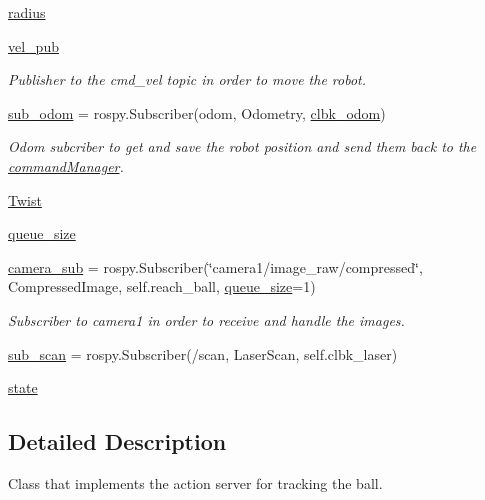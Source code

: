 \begin{DoxyCompactItemize}
\hyperlink{classtrackObj_1_1TrackAction_ae25c734aa5186c31952d4faaa46f2c87}{radius}
\item 
\hyperlink{classtrackObj_1_1TrackAction_ab9175815577a975030b162b3f450995a}{vel\+\_\+pub}
\begin{DoxyCompactList}\small\item\em Publisher to the cmd\+\_\+vel topic in order to move the robot. \end{DoxyCompactList}\item 
\hyperlink{classtrackObj_1_1TrackAction_ab3c7dde48dee75ff2334f0b834c1bbff}{sub\+\_\+odom} = rospy.\+Subscriber(\textquotesingle{}odom\textquotesingle{}, Odometry, \hyperlink{namespacetrackObj_a7115a4055cdfb15c1ef11a408d59f842}{clbk\+\_\+odom})
\begin{DoxyCompactList}\small\item\em Odom subcriber to get and save the robot position and send them back to the \hyperlink{namespacecommandManager}{command\+Manager}. \end{DoxyCompactList}\item 
\hyperlink{classtrackObj_1_1TrackAction_a0b3d5b465c4212747cc29a6c478a81eb}{Twist}
\item 
\hyperlink{classtrackObj_1_1TrackAction_a1ca982e6f881cd51690264f502781c04}{queue\+\_\+size}
\item 
\hyperlink{classtrackObj_1_1TrackAction_acc882f12fe6442f22f15258f0c92785f}{camera\+\_\+sub} = rospy.\+Subscriber(\char`\"{}camera1/image\+\_\+raw/compressed\char`\"{}, Compressed\+Image, self.\+reach\+\_\+ball, \hyperlink{classtrackObj_1_1TrackAction_a1ca982e6f881cd51690264f502781c04}{queue\+\_\+size}=1)
\begin{DoxyCompactList}\small\item\em Subscriber to camera1 in order to receive and handle the images. \end{DoxyCompactList}\item 
\hyperlink{classtrackObj_1_1TrackAction_ac76d0b7d602402756b8dd186a89962de}{sub\+\_\+scan} = rospy.\+Subscriber(\textquotesingle{}/scan\textquotesingle{}, Laser\+Scan, self.\+clbk\+\_\+laser)
\item 
\hyperlink{classtrackObj_1_1TrackAction_a6462afc7fd3bfdfe50bcafe449e1039a}{state}
\end{DoxyCompactItemize}


\subsection{Detailed Description}
Class that implements the action server for tracking the ball. 


